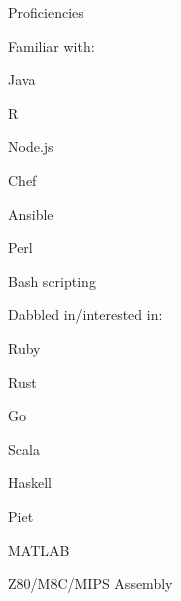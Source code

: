 \documentclass[letterpaper,12pt]{article}
\begin{document}
\begin{paracol}{2}
\begin{res_section}{Proficiencies}
\begin{res_subsection}{Familiar with:}
   \item Java
   \item R
   \item Node.js
   \item Chef
   \item Ansible
   \item Perl
   \item Bash scripting
\end{res_subsection}
\begin{res_subsection}{Dabbled in/interested in:}
   \item Ruby
   \item Rust
   \item Go
   \item Scala
   \item Haskell
   \item Piet
   \item MATLAB
   \item Z80/M8C/MIPS Assembly
\end{res_subsection}
\end{res_section}

\switchcolumn
  \vspace{6pt}


\end{paracol}
\end{document}
